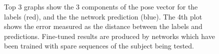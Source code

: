 \documentclass[11pt]{article} %
\begin{document}
\begin{figure}
\qquad
{}%
\qquad
{}%
\qquad
{}%
\caption{Top 3 graphs show the 3 components of the pose vector for the labels (red), and the the network prediction (blue). The 4th plot shows the error measured as the distance between the labels and predictions. Fine-tuned results are produced by networks which have been trained with spare sequences of the subject being tested. }
\label{fig:s1-6}
\end{figure}
\end{document}

